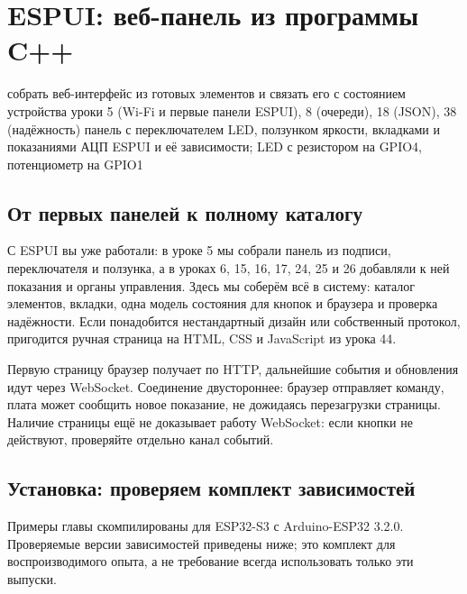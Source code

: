\section{ESPUI: веб-панель из программы C++}\label{les:espui}
\lessonintro
  {собрать веб-интерфейс из готовых элементов и связать его с состоянием устройства}
  {уроки 5 (Wi-Fi и первые панели ESPUI), 8 (очереди), 18 (JSON), 38 (надёжность)}
  {панель с переключателем LED, ползунком яркости, вкладками и показаниями АЦП}
  {ESPUI и её зависимости; LED с резистором на GPIO4, потенциометр на GPIO1}


\subsection{От первых панелей к полному каталогу}

С ESPUI вы уже работали: в уроке 5 мы собрали панель из подписи, переключателя и ползунка, а в уроках 6, 15, 16, 17, 24, 25 и 26 добавляли к ней показания и органы управления. Здесь мы соберём всё в систему: каталог элементов, вкладки, одна модель состояния для кнопок и браузера и проверка надёжности. Если понадобится нестандартный дизайн или собственный протокол, пригодится ручная страница на HTML, CSS и JavaScript из урока 44.

Первую страницу браузер получает по HTTP, дальнейшие события и обновления идут через WebSocket.
Соединение двустороннее: браузер отправляет команду, плата может сообщить новое показание,
не дожидаясь перезагрузки страницы. Наличие страницы ещё не доказывает работу WebSocket:
если кнопки не действуют, проверяйте отдельно канал событий.

\subsection{Установка: проверяем комплект зависимостей}

Примеры главы скомпилированы для ESP32-S3 с Arduino-ESP32 3.2.0.
Проверяемые версии зависимостей приведены ниже; это комплект для воспроизводимого опыта,
а не требование всегда использовать только эти выпуски.

